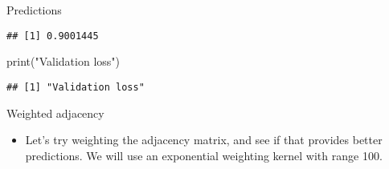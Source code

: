 \documentclass[
  ignorenonframetext,
]{beamer}
\newenvironment{Shaded}{\begin{snugshade}}{\end{snugshade}}
\newcommand{\DecValTok}[1]{\textcolor[rgb]{0.00,0.00,0.81}{#1}}
\newcommand{\FunctionTok}[1]{\textcolor[rgb]{0.00,0.00,0.00}{#1}}
\newcommand{\NormalTok}[1]{#1}
\newcommand{\OtherTok}[1]{\textcolor[rgb]{0.56,0.35,0.01}{#1}}
\newcommand{\SpecialCharTok}[1]{\textcolor[rgb]{0.00,0.00,0.00}{#1}}
\newcommand{\StringTok}[1]{\textcolor[rgb]{0.31,0.60,0.02}{#1}}
\providecommand{\tightlist}{%
  \setlength{\itemsep}{0pt}\setlength{\parskip}{0pt}}
\begin{document}
\begin{frame}[fragile]{Predictions}
\begin{verbatim}
## [1] 0.9001445
\end{verbatim}

\begin{Shaded}
\begin{Highlighting}[]
\FunctionTok{print}\NormalTok{(}\StringTok{"Validation loss"}\NormalTok{)}
\end{Highlighting}
\end{Shaded}

\begin{verbatim}
## [1] "Validation loss"
\end{verbatim}
\end{frame}

\begin{frame}[fragile]{Weighted adjacency}
\protect\hypertarget{weighted-adjacency}{}
\begin{itemize}
\tightlist
\item
  Let's try weighting the adjacency matrix, and see if that provides
  better predictions. We will use an exponential weighting kernel with
  range 100.
\end{itemize}

\begin{Shaded}
\end{Shaded}
\end{frame}
\end{document}
